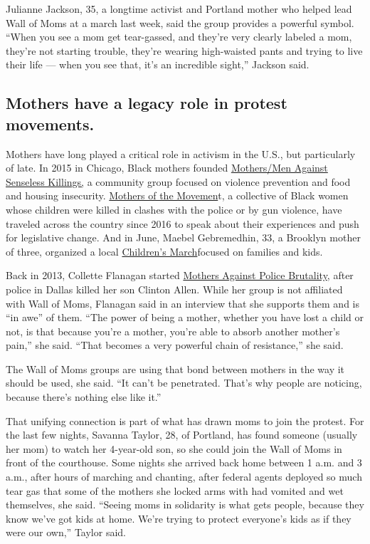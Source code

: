 Julianne Jackson, 35, a longtime activist and Portland mother who helped
lead Wall of Moms at a march last week, said the group provides a
powerful symbol. ``When you see a mom get tear-gassed, and they're very
clearly labeled a mom, they're not starting trouble, they're wearing
high-waisted pants and trying to live their life --- when you see that,
it's an incredible sight,'' Jackson said.

\hypertarget{mothers-have-a-legacy-role-in-protest-movements}{%
\subsection{Mothers have a legacy role in protest
movements.}\label{mothers-have-a-legacy-role-in-protest-movements}}

Mothers have long played a critical role in activism in the U.S., but
particularly of late. In 2015 in Chicago, Black mothers founded
\href{https://www.ontheblock.org/about}{Mothers/Men Against Senseless
Killings,} a community group focused on violence prevention and food and
housing insecurity.
\href{https://www.theguardian.com/world/2016/nov/22/mothers-of-the-movement-trayvon-martin-sandra-bland-eric-garner-amadou-diallo-sean-bell}{Mothers
of the Movemen}t, a collective of Black women whose children were killed
in clashes with the police or by gun violence, have traveled across the
country since 2016 to speak about their experiences and push for
legislative change. And in June, Maebel Gebremedhin, 33, a Brooklyn
mother of three, organized a local
\href{https://www.nytimes.com/2020/06/15/parenting/childrens-march-protest-brooklyn.html}{Children's
March}focused on families and kids.

Back in 2013, Collette Flanagan started
\href{https://mothersagainstpolicebrutality.org/about/}{Mothers Against
Police Brutality}, after police in Dallas killed her son Clinton Allen.
While her group is not affiliated with Wall of Moms, Flanagan said in an
interview that she supports them and is ``in awe'' of them. ``The power
of being a mother, whether you have lost a child or not, is that because
you're a mother, you're able to absorb another mother's pain,'' she
said. ``That becomes a very powerful chain of resistance,'' she said.

The Wall of Moms groups are using that bond between mothers in the way
it should be used, she said. ``It can't be penetrated. That's why people
are noticing, because there's nothing else like it.''

That unifying connection is part of what has drawn moms to join the
protest. For the last few nights, Savanna Taylor, 28, of Portland, has
found someone (usually her mom) to watch her 4-year-old son, so she
could join the Wall of Moms in front of the courthouse. Some nights she
arrived back home between 1 a.m. and 3 a.m., after hours of marching and
chanting, after federal agents deployed so much tear gas that some of
the mothers she locked arms with had vomited and wet themselves, she
said. ``Seeing moms in solidarity is what gets people, because they know
we've got kids at home. We're trying to protect everyone's kids as if
they were our own,'' Taylor said.


